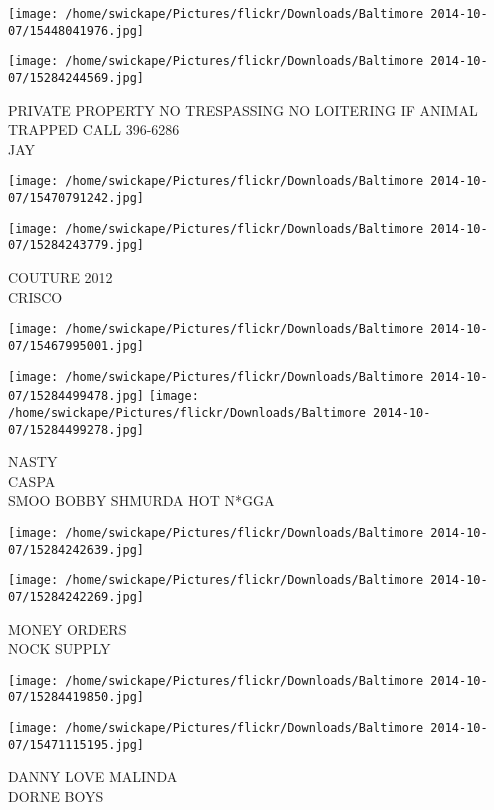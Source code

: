 \documentclass[10pt,letterpaper]{article}
\begin{document}
\texttt{[image: /home/swickape/Pictures/flickr/Downloads/Baltimore 2014-10-07/15448041976.jpg]}

\vspace{0.25in}
\texttt{[image: /home/swickape/Pictures/flickr/Downloads/Baltimore 2014-10-07/15284244569.jpg]}

PRIVATE PROPERTY NO TRESPASSING NO LOITERING IF ANIMAL TRAPPED CALL 396{-}6286\\
JAY
\pagebreak

\texttt{[image: /home/swickape/Pictures/flickr/Downloads/Baltimore 2014-10-07/15470791242.jpg]}

\vspace{0.25in}
\texttt{[image: /home/swickape/Pictures/flickr/Downloads/Baltimore 2014-10-07/15284243779.jpg]}

COUTURE 2012\\
CRISCO
\pagebreak

\texttt{[image: /home/swickape/Pictures/flickr/Downloads/Baltimore 2014-10-07/15467995001.jpg]}

\vspace{0.25in}
\texttt{[image: /home/swickape/Pictures/flickr/Downloads/Baltimore 2014-10-07/15284499478.jpg]}
\texttt{[image: /home/swickape/Pictures/flickr/Downloads/Baltimore 2014-10-07/15284499278.jpg]}

NASTY\\
CASPA\\
SMOO BOBBY SHMURDA HOT N*GGA
\pagebreak

\texttt{[image: /home/swickape/Pictures/flickr/Downloads/Baltimore 2014-10-07/15284242639.jpg]}

\vspace{0.25in}
\texttt{[image: /home/swickape/Pictures/flickr/Downloads/Baltimore 2014-10-07/15284242269.jpg]}

MONEY ORDERS\\
NOCK SUPPLY
\pagebreak

\texttt{[image: /home/swickape/Pictures/flickr/Downloads/Baltimore 2014-10-07/15284419850.jpg]}

\vspace{0.25in}
\texttt{[image: /home/swickape/Pictures/flickr/Downloads/Baltimore 2014-10-07/15471115195.jpg]}

DANNY LOVE MALINDA\\
DORNE BOYS
\pagebreak
\end{document}
